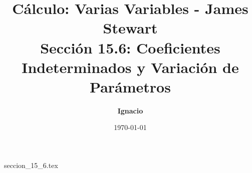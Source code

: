 \documentclass[11pt,spanish,oneside]{report}
\title{\textbf{Cálculo: Varias Variables - James Stewart} \\ \Large Sección 15.6: Coeficientes Indeterminados y Variación de Parámetros}
\author{\textbf{Ignacio}}
\date{\today}
\begin{document}
\maketitle

{seccion_15_6.tex}
\end{document}
